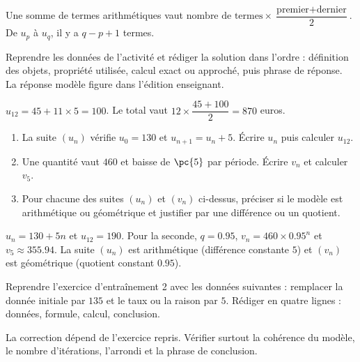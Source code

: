 \begin{summary}Une somme de termes arithmétiques vaut $\text{nombre de termes}\times\dfrac{\text{premier}+\text{dernier}}2$. De $u_p$ à $u_q$, il y a $q-p+1$ termes.\end{summary}

\begin{example}
Reprendre les données de l'activité et rédiger la solution dans l'ordre : définition des objets, propriété utilisée, calcul exact ou approché, puis phrase de réponse. La réponse modèle figure dans l'édition enseignant.
\end{example}
\begin{solution}$u_{12}=45+11\times5=100$. Le total vaut $12\times\dfrac{45+100}{2}=870$ euros.\end{solution}

\begin{exercise}[essentiel]
\begin{enumerate}\item La suite $(u_n)$ vérifie $u_0=130$ et $u_{n+1}=u_n+5$. Écrire $u_n$ puis calculer $u_{12}$.\item Une quantité vaut $460$ et baisse de $\pc{5}$ par période. Écrire $v_n$ et calculer $v_5$.\item Pour chacune des suites $(u_n)$ et $(v_n)$ ci-dessus, préciser si le modèle est arithmétique ou géométrique et justifier par une différence ou un quotient.\end{enumerate}
\end{exercise}
\begin{solution}$u_n=130+5n$ et $u_{12}=190$. Pour la seconde, $q=\num{0,95}$, $v_n=460\times\num{0,95}^n$ et $v_5\approx\num{355,94}$. La suite $(u_n)$ est arithmétique (différence constante $5$) et $(v_n)$ est géométrique (quotient constant $\num{0,95}$).\end{solution}


\begin{homework}Reprendre l'exercice d'entraînement 2 avec les données suivantes : remplacer la donnée initiale par $135$ et le taux ou la raison par $5$. Rédiger en quatre lignes : données, formule, calcul, conclusion.\end{homework}
\begin{solution}La correction dépend de l'exercice repris. Vérifier surtout la cohérence du modèle, le nombre d'itérations, l'arrondi et la phrase de conclusion.\end{solution}

